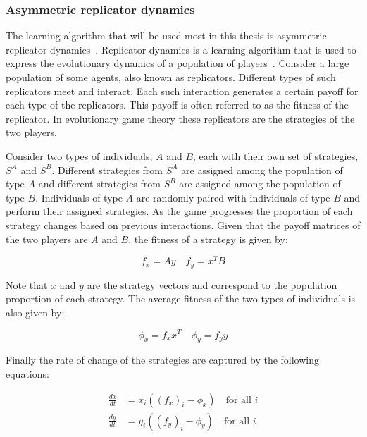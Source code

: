 \subsubsection{Asymmetric replicator dynamics}

The learning algorithm that will be used most in this thesis is asymmetric
replicator dynamics~\cite{accinelli2011evolutionarily}.
Replicator dynamics is a learning algorithm that is used to express the
evolutionary dynamics of a population of players~\cite{komarova2004replicator}.
Consider a large population of some agents, also known as replicators.
Different types of such replicators meet and interact.
Each such interaction generates a certain payoff for each type of the
replicators.
This payoff is often referred to as the fitness of the replicator.
In evolutionary game theory these replicators are the strategies of the two
players.

Consider two types of individuals, \(A\) and \(B\), each with their own set of
strategies, \(S^A\) and \(S^B\).
Different strategies from \(S^A\) are assigned among the population of type
\(A\) and different strategies from \(S^B\) are assigned among the population
of type \(B\).
Individuals of type \(A\) are randomly paired with individuals of type \(B\)
and perform their assigned strategies.
As the game progresses the proportion of each strategy changes based on previous
interactions.
Given that the payoff matrices of the two players are \(A\) and \(B\), the
fitness of a strategy is given by:

\begin{equation}\label{eq:fitness_definition}
    f_x = A y \quad f_y = x^T B
\end{equation}

Note that \(x\) and \(y\) are the strategy vectors and correspond to the
population proportion of each strategy.
The average fitness of the two types of individuals is also given by:

\begin{equation}\label{eq:average_fitness_definition}
    \phi_x = f_x x^T \quad \phi_y = f_y y
\end{equation}

Finally the rate of change of the strategies are captured by the following
equations:

\begin{align}\label{eq:replicator_dynamics}
    \frac{dx}{dt} &= x_i((f_x)_i - \phi_x) \quad \text{for all } i \\
    \frac{dy}{dt} &= y_i((f_y)_i - \phi_y) \quad \text{for all } i
\end{align}


